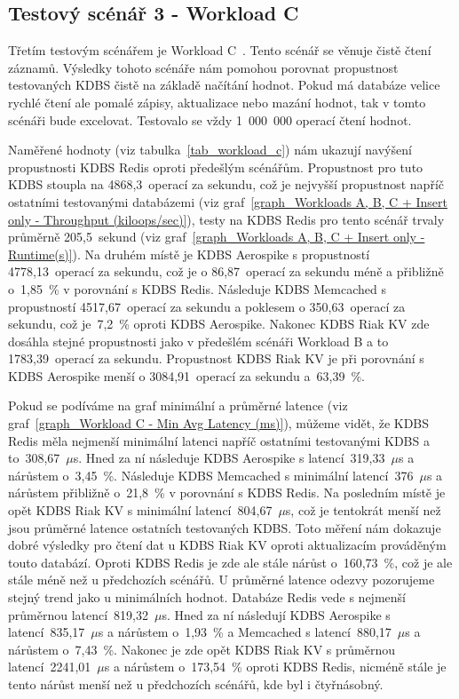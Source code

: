 \documentclass[czech,master,dept460,male,csharp,cpdeclaration]{diploma}
\begin{document}
	\subsection{Testový scénář 3 - Workload C}
	
	Třetím testovým scénářem je Workload C~\cite{workloads}. Tento scénář se věnuje čistě čtení záznamů. Výsledky tohoto scénáře nám pomohou porovnat propustnost testovaných KDBS čistě na základě načítání hodnot. Pokud má databáze velice rychlé čtení ale pomalé zápisy, aktualizace nebo mazání hodnot, tak v tomto scénáři bude excelovat. Testovalo se vždy 1~000~000 operací čtení hodnot.
	
	Naměřené hodnoty (viz tabulka~\ref{tab_workload_c}) nám ukazují navýšení propustnosti KDBS Redis oproti předešlým scénářům. Propustnost pro tuto KDBS stoupla na 4868,3~operací za sekundu, což je nejvyšší propustnost napříč ostatními testovanými databázemi (viz graf~\ref{graph_Workloads A, B, C + Insert only - Throughput (kiloops/sec)}), testy na KDBS Redis pro tento scénář trvaly průměrně 205,5~sekund (viz graf~\ref{graph_Workloads A, B, C + Insert only - Runtime(s)}). Na druhém místě je KDBS Aerospike s propustností 4778,13~operací za sekundu, což je o 86,87~operací za sekundu méně a přibližně o~1,85~\% v porovnání s KDBS Redis. Následuje KDBS Memcached s propustností 4517,67~operací za sekundu a poklesem o 350,63~operací za sekundu, což je~7,2~\% oproti KDBS Aerospike. Nakonec KDBS Riak KV zde dosáhla stejné propustnosti jako v předešlém scénáři Workload B a to 1783,39~operací za sekundu. Propustnost KDBS Riak KV je při porovnání s KDBS Aerospike menší o 3084,91~operací za sekundu a~63,39~\%.
	
	Pokud se podíváme na graf minimální a průměrné latence (viz graf~\ref{graph_Workload C - Min Avg Latency (ms)}), můžeme vidět, že KDBS Redis měla nejmenší minimální latenci napříč ostatními testovanými KDBS a to~308,67~$\mu$s. Hned za ní následuje KDBS Aerospike s latencí~319,33~$\mu$s a nárůstem o~3,45~\%. Následuje KDBS Memcached s minimální latencí~376~$\mu$s a nárůstem přibližně o~21,8~\% v porovnání s KDBS Redis. Na posledním místě je opět KDBS Riak KV s minimální latencí~804,67~$\mu$s, což je tentokrát menší než jsou průměrné latence ostatních testovaných KDBS. Toto měření nám dokazuje dobré výsledky pro čtení dat u KDBS Riak KV oproti aktualizacím prováděným touto databází. Oproti KDBS Redis je zde ale stále nárůst o~160,73~\%, což je ale stále méně než u předchozích scénářů. U průměrné latence odezvy pozorujeme stejný trend jako u minimálních hodnot. Databáze Redis vede s nejmenší průměrnou latencí~819,32~$\mu$s. Hned za ní následují KDBS Aerospike s latencí~835,17~$\mu$s a nárůstem o~1,93~\% a Memcached s latencí~880,17~$\mu$s a nárůstem o~7,43~\%. Nakonec je zde opět KDBS Riak KV s průměrnou latencí~2241,01~$\mu$s a nárůstem o~173,54~\% oproti KDBS Redis, nicméně stále je tento nárůst menší než u předchozích scénářů, kde byl i čtyřnásobný.
	
\end{document}

